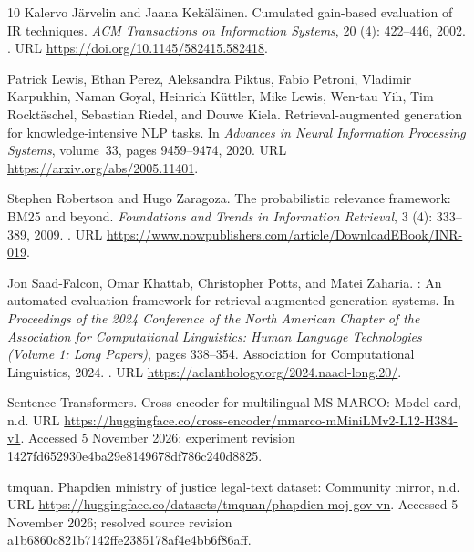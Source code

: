 \documentclass[11pt,a4paper,oneside]{report}
\begin{document}
\begin{thebibliography}{10}
Kalervo J{\"a}rvelin and Jaana Kek{\"a}l{\"a}inen.
\newblock Cumulated gain-based evaluation of {IR} techniques.
\newblock \emph{ACM Transactions on Information Systems}, 20
  (4): 422--446, 2002.
\newblock {}.
\newblock URL \url{https://doi.org/10.1145/582415.582418}.

Patrick Lewis, Ethan Perez, Aleksandra Piktus, Fabio Petroni, Vladimir
  Karpukhin, Naman Goyal, Heinrich K{\"u}ttler, Mike Lewis, Wen-tau Yih, Tim
  Rockt{\"a}schel, Sebastian Riedel, and Douwe Kiela.
\newblock Retrieval-augmented generation for knowledge-intensive {NLP} tasks.
\newblock In \emph{Advances in Neural Information Processing Systems},
  volume~33, pages 9459--9474, 2020.
\newblock URL \url{https://arxiv.org/abs/2005.11401}.

Stephen Robertson and Hugo Zaragoza.
\newblock The probabilistic relevance framework: {BM25} and beyond.
\newblock \emph{Foundations and Trends in Information Retrieval}, 3
  (4): 333--389, 2009.
\newblock {}.
\newblock URL
  \url{https://www.nowpublishers.com/article/DownloadEBook/INR-019}.

Jon Saad-Falcon, Omar Khattab, Christopher Potts, and Matei Zaharia.
: An automated evaluation framework for retrieval-augmented
  generation systems.
\newblock In \emph{Proceedings of the 2024 Conference of the North American
  Chapter of the Association for Computational Linguistics: Human Language
  Technologies (Volume 1: Long Papers)}, pages 338--354. Association for
  Computational Linguistics, 2024.
\newblock {}.
\newblock URL \url{https://aclanthology.org/2024.naacl-long.20/}.

{Sentence Transformers}.
\newblock Cross-encoder for multilingual {MS MARCO}: Model card, n.d.
\newblock URL
  \url{https://huggingface.co/cross-encoder/mmarco-mMiniLMv2-L12-H384-v1}.
\newblock Accessed 5 November 2026; experiment revision
  1427fd652930e4ba29e8149678df786c240d8825.

{tmquan}.
\newblock Phapdien ministry of justice legal-text dataset: Community mirror,
  n.d.
\newblock URL \url{https://huggingface.co/datasets/tmquan/phapdien-moj-gov-vn}.
\newblock Accessed 5 November 2026; resolved source revision
  a1b6860c821b7142ffe2385178af4e4bb6f86aff.

\end{thebibliography}
\end{document}
